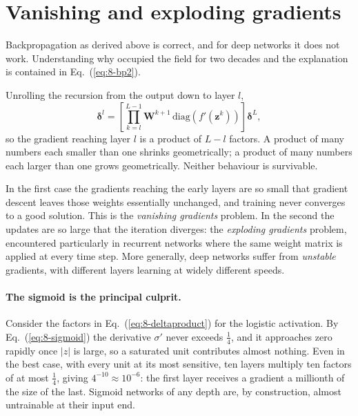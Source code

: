 
\section{Vanishing and exploding gradients}
\label{sec:vanishing}

Backpropagation as derived above is correct, and for deep networks it does not
work.  Understanding why occupied the field for two decades and the explanation
is contained in Eq.~(\ref{eq:8-bp2}).

Unrolling the recursion from the output down to layer $l$,
\begin{equation}
  \bm{\delta}^{l} = \left[\prod_{k=l}^{L-1}
    \bm{W}^{k+1}\,\mathrm{diag}\left(f'(\bm{z}^{k})\right)\right]
    \bm{\delta}^{L},
  \label{eq:8-deltaproduct}
\end{equation}
so the gradient reaching layer $l$ is a product of $L-l$ factors.  A product of
many numbers each smaller than one shrinks geometrically; a product of many
numbers each larger than one grows geometrically.  Neither behaviour is
survivable.

In the first case the gradients reaching the early layers are so small that
gradient descent leaves those weights essentially unchanged, and training never
converges to a good solution.  This is the \emph{vanishing gradients} problem.
In the second the updates are so large that the iteration diverges: the
\emph{exploding gradients} problem, encountered particularly in recurrent
networks where the same weight matrix is applied at every time step.  More
generally, deep networks suffer from \emph{unstable} gradients, with different
layers learning at widely different speeds.

\paragraph{The sigmoid is the principal culprit.}
Consider the factors in Eq.~(\ref{eq:8-deltaproduct}) for the logistic
activation.  By Eq.~(\ref{eq:8-sigmoid}) the derivative $\sigma'$ never exceeds
$\tfrac14$, and it approaches zero rapidly once $|z|$ is large, so a saturated
unit contributes almost nothing.  Even in the best case, with every unit at its
most sensitive, ten layers multiply ten factors of at most $\tfrac14$, giving
$4^{-10}\approx10^{-6}$: the first layer receives a gradient a millionth of the
size of the last.  Sigmoid networks of any depth are, by construction, almost
untrainable at their input end.

